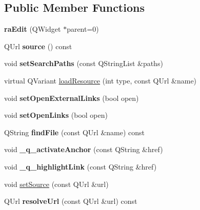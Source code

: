\subsection*{Public Member Functions}
\begin{DoxyCompactItemize}
\item 
\hypertarget{classraEdit_a5d054325340671ea55dbcd3a538c2725}{
{\bfseries raEdit} (QWidget $\ast$parent=0)}
\label{classraEdit_a5d054325340671ea55dbcd3a538c2725}

\item 
\hypertarget{classraEdit_a28fd8d4d4b4eeeed8276e1d09461d824}{
QUrl {\bfseries source} () const }
\label{classraEdit_a28fd8d4d4b4eeeed8276e1d09461d824}

\item 
\hypertarget{classraEdit_ad48742722c9b2c1a6fb687b1610d1402}{
void {\bfseries setSearchPaths} (const QStringList \&paths)}
\label{classraEdit_ad48742722c9b2c1a6fb687b1610d1402}

\item 
virtual QVariant \hyperlink{classraEdit_a88d6a5ed8345f496dfa43a78a9240d1a}{loadResource} (int type, const QUrl \&name)
\item 
\hypertarget{classraEdit_ac3b7b0e1430b2b8cfe5c37e75955b729}{
void {\bfseries setOpenExternalLinks} (bool open)}
\label{classraEdit_ac3b7b0e1430b2b8cfe5c37e75955b729}

\item 
\hypertarget{classraEdit_ace8a8d6ffa8ad676e0affd4495885277}{
void {\bfseries setOpenLinks} (bool open)}
\label{classraEdit_ace8a8d6ffa8ad676e0affd4495885277}

\item 
\hypertarget{classraEdit_a5b6b0f207f4962738b8fb1774da52d65}{
QString {\bfseries findFile} (const QUrl \&name) const }
\label{classraEdit_a5b6b0f207f4962738b8fb1774da52d65}

\item 
\hypertarget{classraEdit_a85bd0a31357f5a1c6d738d2041da495f}{
void {\bfseries \_\-q\_\-activateAnchor} (const QString \&href)}
\label{classraEdit_a85bd0a31357f5a1c6d738d2041da495f}

\item 
\hypertarget{classraEdit_a458af65b45760161d41b1def5f46444c}{
void {\bfseries \_\-q\_\-highlightLink} (const QString \&href)}
\label{classraEdit_a458af65b45760161d41b1def5f46444c}

\item 
void \hyperlink{classraEdit_a8ba687ccd78c096ef0b9577a8238bb3f}{setSource} (const QUrl \&url)
\item 
\hypertarget{classraEdit_a845a844f4f4efb1387d51d13e1861c39}{
QUrl {\bfseries resolveUrl} (const QUrl \&url) const }
\label{classraEdit_a845a844f4f4efb1387d51d13e1861c39}


\end{DoxyCompactItemize}
